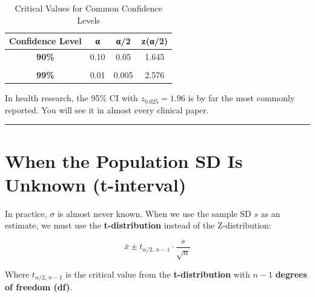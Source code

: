 \documentclass[
  12pt,
  letterpaper,
]{book}
\begin{document}
\begin{longtable}[t]{>{}cccc}

\caption{\label{tbl-z-critical}Critical Values for Common Confidence
Levels}

\tabularnewline

\toprule
Confidence Level & α & α/2 & z(α/2)\\
\midrule
\textcolor[HTML]{2c7bb6}{\textbf{90\%}} & 0.10 & 0.05 & 1.645\\
\cellcolor[HTML]{eaf4fb}{\textcolor[HTML]{2c7bb6}{\textbf{95\%}}} & \cellcolor[HTML]{eaf4fb}{0.05} & \cellcolor[HTML]{eaf4fb}{0.025} & \cellcolor[HTML]{eaf4fb}{1.960}\\
\textcolor[HTML]{2c7bb6}{\textbf{99\%}} & 0.01 & 0.005 & 2.576\\
\bottomrule

\end{longtable}

\endgroup{}

\begin{tcolorbox}[enhanced jigsaw, arc=.35mm, bottomrule=.15mm, bottomtitle=1mm, breakable, colback=white, colbacktitle=quarto-callout-tip-color!10!white, colframe=quarto-callout-tip-color-frame, coltitle=black, left=2mm, leftrule=.75mm, opacityback=0, opacitybacktitle=0.6, rightrule=.15mm, title={💡 The Most Used Value}, titlerule=0mm, toprule=.15mm, toptitle=1mm]

In health research, the 95\% CI with \(z_{0.025} = 1.96\) is by far the
most commonly reported. You will see it in almost every clinical paper.

\end{tcolorbox}

\begin{center}\rule{0.5\linewidth}{0.5pt}\end{center}

\section{When the Population SD Is Unknown
(t-interval)}\label{when-the-population-sd-is-unknown-t-interval}

In practice, \(\sigma\) is almost never known. When we use the sample SD
\(s\) as an estimate, we must use the \textbf{t-distribution} instead of
the Z-distribution:

\[\bar{x} \pm t_{\alpha/2,\, n-1} \cdot \frac{s}{\sqrt{n}}\]

Where \(t_{\alpha/2,\, n-1}\) is the critical value from the
\textbf{t-distribution} with \(n - 1\) \textbf{degrees of freedom (df)}.
\end{document}

